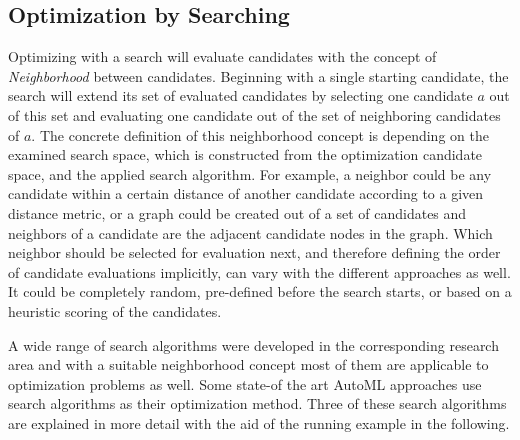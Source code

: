 \subsection{Optimization by Searching}
\label{sec:theory:optimization:search}
Optimizing with a search will evaluate candidates with the concept of \textit{Neighborhood} between candidates.
Beginning with a single starting candidate, the search will extend its set of evaluated candidates by selecting one candidate $a$ out of this set and evaluating one candidate out of the set of neighboring candidates of $a$.\newline
The concrete definition of this neighborhood concept is depending on the examined search space, which is constructed from the optimization candidate space, and the applied search algorithm.
For example, a neighbor could be any candidate within a certain distance of another candidate according to a given distance metric, or a graph could be created out of a set of candidates and neighbors of a candidate are the adjacent candidate nodes in the graph.\newline
Which neighbor should be selected for evaluation next, and therefore defining the order of candidate evaluations implicitly, can vary with the different approaches as well.
It could be completely random, pre-defined before the search starts, or based on a heuristic scoring of the candidates.

A wide range of search algorithms were developed in the corresponding research area and with a suitable neighborhood concept most of them are applicable to optimization problems as well.
Some state-of the art AutoML approaches use search algorithms as their optimization method.
Three of these search algorithms are explained in more detail with the aid of the running example in the following.

